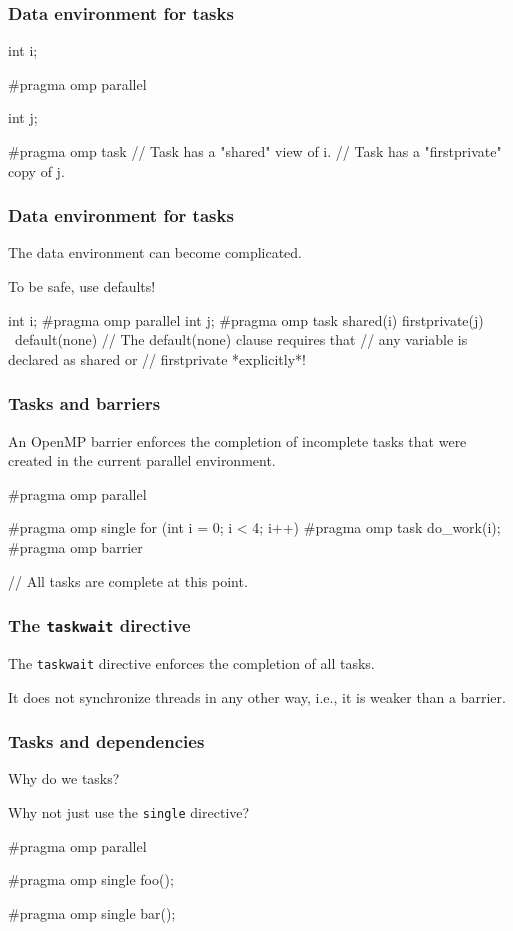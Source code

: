 \documentclass[12pt,t]{beamer}
\let\emph\relax %
\begin{document}
  \begin{frame}[fragile]
    \frametitle{Data environment for tasks}

    \begin{code}
int i;

#pragma omp parallel
{
  int j;

  #pragma omp task
  {
    // Task has a "shared" view of i.
    // Task has a "firstprivate" copy of j.
  }
}
    \end{code}
  \end{frame}

  \begin{frame}[fragile]
    \frametitle{Data environment for tasks}

    The data environment can become complicated.

    To be safe, use defaults!

    \begin{code}
int i;
#pragma omp parallel
{
  int j;
  #pragma omp task shared(i) firstprivate(j) \
                   default(none)
  {
    // The default(none) clause requires that
    // any variable is declared as shared or
    // firstprivate *explicitly*!
  }
}
    \end{code}
  \end{frame}

  \begin{frame}[fragile]
    \frametitle{Tasks and barriers}

    An OpenMP barrier enforces the completion of \emph{all} incomplete tasks that were created in the current parallel environment.

    \begin{code}
#pragma omp parallel
{
  #pragma omp single
  for (int i = 0; i < 4; i++) {
    #pragma omp task
    do_work(i);
  }
  #pragma omp barrier

  // All tasks are complete at this point.
}
    \end{code}
  \end{frame}

  \begin{frame}[fragile]
    \frametitle{The \texttt{taskwait} directive}

    The \texttt{taskwait} directive enforces the completion of all \emph{child} tasks.

    It does not synchronize threads in any other way, i.e., it is weaker than a barrier.
  \end{frame}

  \begin{frame}[fragile]
    \frametitle{Tasks and dependencies}

    Why do we \emph{need} tasks?

    Why not just use the \texttt{single} directive?
    \begin{code}
#pragma omp parallel
{
  #pragma omp single
  foo();

  #pragma omp single
  bar();
}
    \end{code}
  \end{frame}
\end{document}
